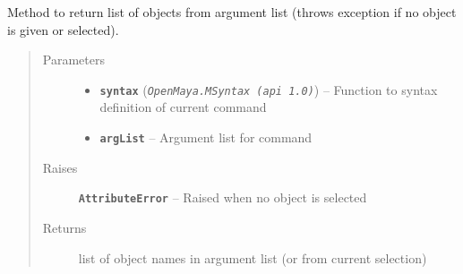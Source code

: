 \documentclass[letterpaper,10pt,english]{sphinxmanual}
\begin{document}
\begin{fulllineitems}
\label{pk_src.misc:pk_src.misc.getArgObj}
Method to return list of objects from argument list (throws exception if no object is given or selected).
\begin{quote}\begin{description}
\item[{Parameters}] \leavevmode\begin{itemize}
\item {} 
\textbf{\texttt{syntax}} (\emph{\texttt{OpenMaya.MSyntax (api 1.0)}}) -- Function to syntax definition of current command

\item {} 
\textbf{\texttt{argList}} -- Argument list for command

\end{itemize}

\item[{Raises}] \leavevmode
\textbf{\texttt{AttributeError}} -- Raised when no object is selected

\item[{Returns}] \leavevmode
list of object names in argument list (or from current selection)

\end{description}\end{quote}

\end{fulllineitems}

\end{document}
